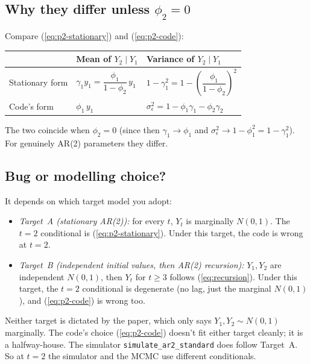 \documentclass[11pt]{article}
\newcommand{\eref}[1]{(\ref{#1})}
\theoremstyle{plain}
\theoremstyle{definition}
\theoremstyle{remark}
\begin{document}
\subsection{Why they differ unless \texorpdfstring{$\phi_2 = 0$}{phi2 = 0}}\label{sec:why-differ}

Compare \eref{eq:p2-stationary} and \eref{eq:p2-code}:
\begin{center}
\begin{tabular}{lll}
\toprule
                  & Mean of $Y_2 \mid Y_1$ & Variance of $Y_2 \mid Y_1$ \\
\midrule
Stationary form   & $\gamma_1 y_1 = \dfrac{\phi_1}{1-\phi_2}\, y_1$
                  & $1 - \gamma_1^2 = 1 - \left(\dfrac{\phi_1}{1-\phi_2}\right)^2$ \\
Code's form       & $\phi_1\, y_1$
                  & $\sigma_\epsilon^2 = 1 - \phi_1 \gamma_1 - \phi_2 \gamma_2$ \\
\bottomrule
\end{tabular}
\end{center}
The two coincide when $\phi_2 = 0$ (since then $\gamma_1 \to \phi_1$ and
$\sigma_\epsilon^2 \to 1 - \phi_1^2 = 1 - \gamma_1^2$). For genuinely
AR(2) parameters they differ.

\subsection{Bug or modelling choice?}\label{sec:bug-vs-choice}

It depends on which target model you adopt:

\begin{itemize}
  \item \emph{Target~A (stationary AR(2)):} for every $t$, $Y_t$ is
        marginally $N(0,1)$. The $t = 2$ conditional is
        \eref{eq:p2-stationary}. Under this target, the code is wrong at
        $t = 2$.
  \item \emph{Target~B (independent initial values, then AR(2) recursion):}
        $Y_1, Y_2$ are independent $N(0,1)$, then $Y_t$ for $t \geq 3$
        follows \eref{eq:recursion}. Under this target, the $t = 2$
        conditional is degenerate (no lag, just the marginal $N(0,1)$),
        and \eref{eq:p2-code} is wrong too.
\end{itemize}
Neither target is dictated by the paper, which only says $Y_1, Y_2 \sim
N(0,1)$ marginally. The code's choice \eref{eq:p2-code} doesn't fit
either target cleanly; it is a halfway-house. The simulator
\texttt{simulate\_ar2\_standard} does follow Target~A. So at $t = 2$
the simulator and the MCMC use different conditionals.
\end{document}
